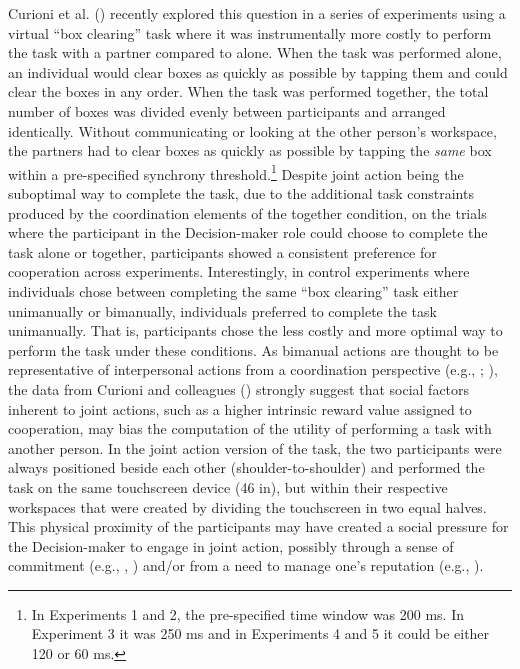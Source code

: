 \documentclass[
  man,
  floatsintext,
  longtable,
  nolmodern,
  notxfonts,
  notimes,
  mask,
  colorlinks=true,linkcolor=blue,citecolor=blue,urlcolor=blue]{apa7}
\begin{document}
Curioni et al. () recently explored this
question in a series of experiments using a virtual ``box clearing''
task where it was instrumentally more costly to perform the task with a
partner compared to alone. When the task was performed alone, an
individual would clear boxes as quickly as possible by tapping them and
could clear the boxes in any order. When the task was performed
together, the total number of boxes was divided evenly between
participants and arranged identically. Without communicating or looking
at the other person's workspace, the partners had to clear boxes as
quickly as possible by tapping the \emph{same} box within a
pre-specified synchrony threshold.\footnote{In Experiments 1 and 2, the
  pre-specified time window was 200 ms. In Experiment 3 it was 250 ms
  and in Experiments 4 and 5 it could be either 120 or 60 ms.} Despite
joint action being the suboptimal way to complete the task, due to the
additional task constraints produced by the coordination elements of the
together condition, on the trials where the participant in the
Decision-maker role could choose to complete the task alone or together,
participants showed a consistent preference for cooperation across
experiments. Interestingly, in control experiments where individuals
chose between completing the same ``box clearing'' task either
unimanually or bimanually, individuals preferred to complete the task
unimanually. That is, participants chose the less costly and more
optimal way to perform the task under these conditions. As bimanual
actions are thought to be representative of interpersonal actions from a
coordination perspective (e.g., ; ),
the data from Curioni and colleagues ()
strongly suggest that social factors inherent to joint actions, such as
a higher intrinsic reward value assigned to cooperation, may bias the
computation of the utility of performing a task with another person. In
the joint action version of the task, the two participants were always
positioned beside each other (shoulder-to-shoulder) and performed the
task on the same touchscreen device (46 in), but within their respective
workspaces that were created by dividing the touchscreen in two equal
halves. This physical proximity of the participants may have created a
social pressure for the Decision-maker to engage in joint action,
possibly through a sense of commitment (e.g.,
,
) and/or from a need to manage one's
reputation (e.g., ).
\end{document}
